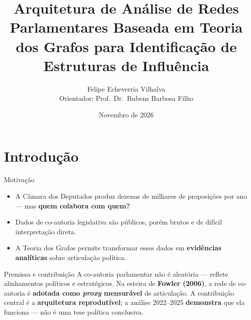 \documentclass{beamer}
\title[Análise de Redes Parlamentares]{Arquitetura de Análise de Redes Parlamentares Baseada em Teoria dos Grafos para Identificação de Estruturas de Influência}
\author[Felipe Echeverria Vilhalva]{Felipe Echeverria Vilhalva \\ \vspace{0.5cm} {\small Orientador: Prof.\ Dr.\ Rubens Barbosa Filho}}
\institute[UEMS]{Universidade Estadual de Mato Grosso do Sul (UEMS)}
\date{Novembro de 2026}
\begin{document}
\begin{frame}
  \titlepage
\end{frame}

\section{Introdução}

\begin{frame}{Motivação}
\begin{itemize}
  \item A Câmara dos Deputados produz dezenas de milhares de proposições por ano — mas \textbf{quem colabora com quem?}
  \item Dados de co-autoria legislativa são públicos, porém brutos e de difícil interpretação direta.
  \item A Teoria dos Grafos permite transformar esses dados em \textbf{evidências analíticas} sobre articulação política.
\end{itemize}

\vspace{0.3cm}
\begin{block}{Premissa e contribuição}
A co-autoria parlamentar não é aleatória — reflete alinhamentos políticos e estratégicos. Na esteira de \textbf{Fowler (2006)}, a rede de co-autoria é \textbf{adotada como \textit{proxy} mensurável} de articulação. A contribuição central é a \textbf{arquitetura reprodutível}; a análise 2022--2025 \textbf{demonstra} que ela funciona — não é uma tese política conclusiva.
\end{block}
\end{frame}
\end{document}
